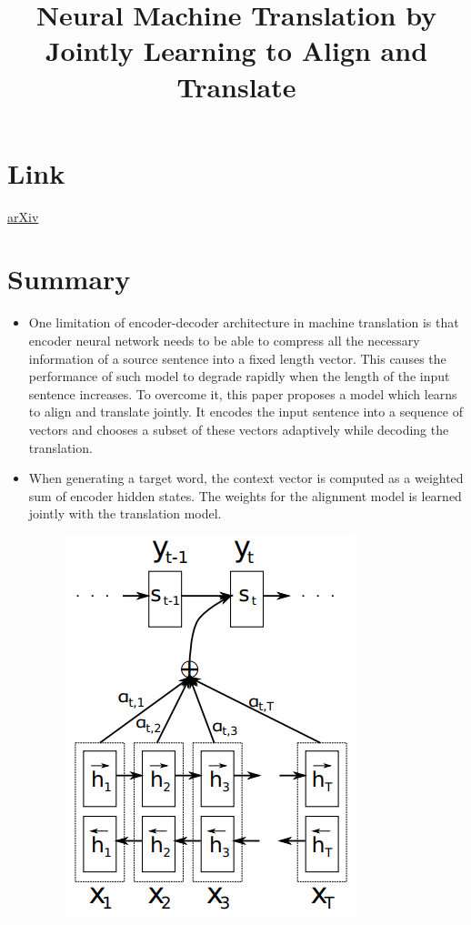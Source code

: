 \documentclass{article}
\title{Neural Machine Translation by Jointly Learning to Align and Translate}
\author{}
\date{}
\begin{document}
\maketitle

\section*{Link}
\href{https://arxiv.org/abs/1409.0473}{arXiv} 

\section*{Summary}
\begin{itemize}
    \item One limitation of encoder-decoder architecture in machine translation is that encoder neural network needs to be able to compress all the necessary information of a source sentence into a fixed length vector. This causes the performance of such model to degrade rapidly when the length of the input sentence increases. To overcome it, this paper proposes a model which learns to align and translate jointly. It encodes the input sentence into a sequence of vectors and chooses a subset of these vectors adaptively while decoding the translation. 
    \item When generating a target word, the context vector is computed as a weighted sum of encoder hidden states. The weights for the alignment model is learned jointly with the translation model.
    \begin{figure}[H]
        \centering
        \includegraphics[scale=0.45]{attention.png}

\end{figure}
\end{itemize}
\end{document}
